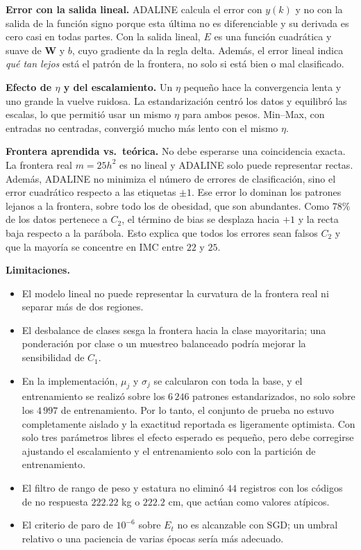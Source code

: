 \documentclass[conference]{IEEEtran}
\begin{document}
\textbf{Error con la salida lineal.} ADALINE calcula el error con $y(k)$ y no
con la salida de la función signo porque esta última no es diferenciable y su
derivada es cero casi en todas partes. Con la salida lineal, $E$ es una
función cuadrática y suave de $\mathbf{W}$ y $b$, cuyo gradiente da la regla
delta. Además, el error lineal indica \emph{qué tan lejos} está el patrón de la
frontera, no solo si está bien o mal clasificado.

\textbf{Efecto de $\eta$ y del escalamiento.} Un $\eta$ pequeño hace
la convergencia lenta y uno grande la vuelve ruidosa. La estandarización
centró los datos y equilibró las escalas, lo que permitió usar un mismo $\eta$
para ambos pesos. Min--Max, con entradas no centradas, convergió mucho más
lento con el mismo $\eta$.

\textbf{Frontera aprendida vs.\ teórica.} No debe esperarse una coincidencia
exacta. La frontera real $m=25h^2$ es no lineal y ADALINE solo puede
representar rectas. Además, ADALINE no minimiza el número de errores de
clasificación, sino el error cuadrático respecto a las etiquetas $\pm1$. Ese
error lo dominan los patrones lejanos a la frontera, sobre todo los de
obesidad, que son abundantes. Como $78\%$ de los datos pertenece a $C_2$,
el término de bias se desplaza hacia $+1$ y la recta baja respecto a la
parábola. Esto explica que todos los errores sean falsos $C_2$ y que la mayoría se
concentre en IMC entre $22$ y $25$.

\textbf{Limitaciones.}
\begin{itemize}
    \item El modelo lineal no puede representar la curvatura de la frontera
    real ni separar más de dos regiones.
    \item El desbalance de clases sesga la frontera hacia la clase
    mayoritaria; una ponderación por clase o un muestreo balanceado podría
    mejorar la sensibilidad de $C_1$.
    \item En la implementación, $\mu_j$ y $\sigma_j$ se calcularon con toda
    la base, y el entrenamiento se realizó sobre los $6\,246$ patrones
    estandarizados, no solo sobre los $4\,997$ de entrenamiento. Por lo tanto, el
    conjunto de prueba no estuvo completamente aislado y la exactitud
    reportada es ligeramente optimista. Con solo tres parámetros libres el
    efecto esperado es pequeño, pero debe corregirse ajustando el escalamiento
    y el entrenamiento solo con la partición de entrenamiento.
    \item El filtro de rango de peso y estatura no eliminó $44$ registros con
    los códigos de no respuesta $222.22$ kg o $222.2$ cm, que actúan como
    valores atípicos.
    \item El criterio de paro de $10^{-6}$ sobre $E_t$ no es alcanzable con SGD;
    un umbral relativo o una paciencia de varias épocas sería más adecuado.
\end{itemize}
\end{document}
